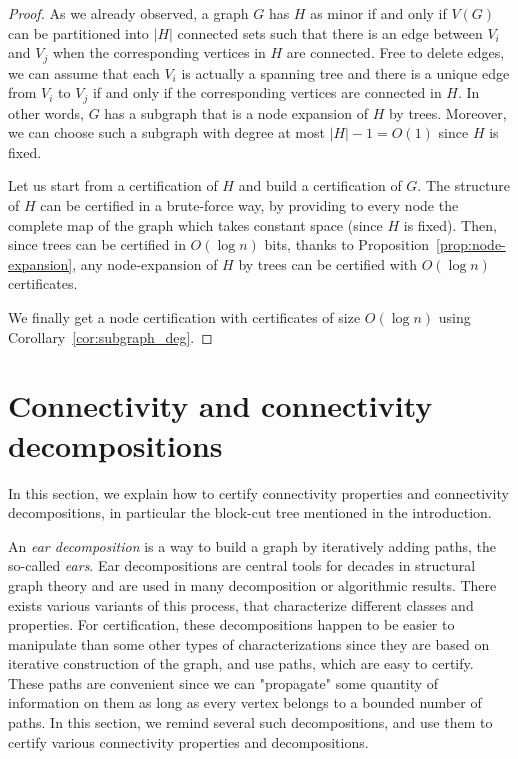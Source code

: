 \documentclass[a4paper,thm-restate,USenglish]{lipics-v2019}
\begin{document}
\begin{proof}
As we already observed, a graph $G$ has $H$ as minor if and only if $V(G)$ can be partitioned into $|H|$ connected sets such that there is an edge between $V_i$ and $V_j$ when the corresponding vertices in $H$ are connected. Free to delete edges, we can assume that each $V_i$ is actually a spanning tree and there is a unique edge from $V_i$ to $V_j$ if and only if the corresponding vertices are connected in $H$.
In other words, $G$ has a subgraph that is a node expansion of $H$ by trees. Moreover, we can choose such a subgraph with degree at most $|H|-1=O(1)$ since $H$ is fixed.

Let us start from a certification of $H$ and build a certification of $G$. 
The structure of $H$ can be certified in a brute-force way, by providing to every node the complete map of the graph which takes constant space (since $H$ is fixed). 
Then, since trees can be certified in $O(\log n)$ bits, thanks to Proposition~\ref{prop:node-expansion}, any node-expansion of $H$ by trees can be certified with $O(\log n)$ certificates.

We finally get a node certification with certificates of size $O(\log n)$ using Corollary~\ref{cor:subgraph_deg}.
\end{proof}

\section{Connectivity and connectivity decompositions}
\label{sec:connectivity}

In this section, we explain how to certify connectivity properties and connectivity decompositions, in particular the block-cut tree mentioned in the introduction. 

An \emph{ear decomposition} is a way to build a graph by iteratively adding paths, the so-called \emph{ears}. 
Ear decompositions are central tools for decades in structural graph theory and are used in many decomposition or algorithmic results.
There exists various variants of this process, that characterize different classes and properties. 
For certification, these decompositions happen to be easier to manipulate than some other types of characterizations since they are based on iterative construction of the graph, and use paths, which are easy to certify. 
These paths are convenient since we can "propagate" some quantity of information on them as long as every vertex belongs to a bounded number of paths. 
In this section, we remind several such decompositions, and use them to certify various connectivity properties and decompositions.
\end{document}
